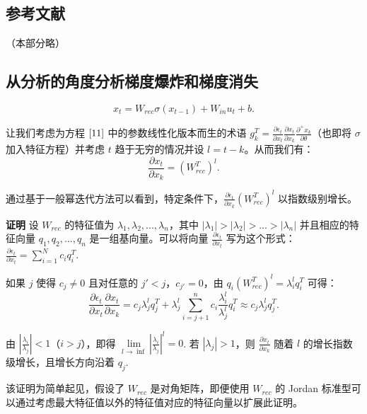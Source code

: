 \subsection{参考文献}\label{ux53c2ux8003ux6587ux732e}

（本部分略）

\subsection{从分析的角度分析梯度爆炸和梯度消失}\label{ux4eceux5206ux6790ux7684ux89d2ux5ea6ux5206ux6790ux68afux5ea6ux7206ux70b8ux548cux68afux5ea6ux6d88ux5931}
\begin{equation}\label{11}
  x_t = W_{rec}\sigma(x_{t-1})+W_{in}u_t+b.
\end{equation}

让我们考虑为方程 \(\eqref{11}\) 中的参数线性化版本而生的术语 \(g_k^T=\frac{\partial\epsilon_t}{\partial x_t}\frac{\partial x_t}{\partial x_k}\frac{\partial^+x_k}{\partial\theta}\)（也即将 \(\sigma\) 加入特征方程）并考虑 \(t\) 趋于无穷的情况并设 \(l=t-k\)。从而我们有：
\begin{equation}\label{12}
  \frac{\partial x_t}{\partial x_k}=(W_{rec}^T)^l.
\end{equation}

通过基于一般幂迭代方法可以看到，特定条件下，\(\frac{\partial \epsilon_t}{\partial x_k}(W_{rec}^T)^l\) 以指数级别增长。

\textbf{证明} 设 \(W_{rec}\) 的特征值为 \(\lambda_1, \lambda_2, ..., \lambda_n\)，其中 \(|\lambda_1|>|\lambda_2|>...>|\lambda_n|\) 并且相应的特征向量 \(q_1, q_2, ..., q_n\) 是一组基向量。可以将向量 \(\frac{\partial\epsilon_t}{\partial x_t}\) 写为这个形式：\(\frac{\partial\epsilon_t}{\partial x_t}=\sum_{i=1}^N c_iq_i^T\).

如果 \(j\) 使得 \(c_j\neq 0\) 且对任意的 \(j'<j\)，\(c_{j'}=0\)，由 \(q_i(W_{rec}^T)^l=\lambda_i^lq_i^T\) 可得：
\begin{equation}\label{13}
  \frac{\partial\epsilon_t}{\partial x_t}\frac{\partial x_t}{\partial x_k}=c_j\lambda_j^lq_j^T+\lambda_j^l\sum_{i=j+1}^{n}c_i\frac{\lambda_i^l}{\lambda_j^l}q_i^T\approx c_j\lambda_j^lq_j^T.
\end{equation}

由 \(|\frac{\lambda_i}{\lambda_j}|<1\)（\(i>j\)），即得 \(\lim\limits_{l\to\inf}|\frac{\lambda_i}{\lambda_j}|^l=0\). 若 \(|\lambda_j|>1\)，则 \(\frac{\partial x_t}{\partial x_k}\) 随着 \(l\) 的增长指数级增长，且增长方向沿着 \(q_j\).

该证明为简单起见，假设了 \(W_{rec}\) 是对角矩阵，即便使用 \(W_{rec}\) 的 Jordan 标准型可以通过考虑最大特征值以外的特征值对应的特征向量以扩展此证明。

